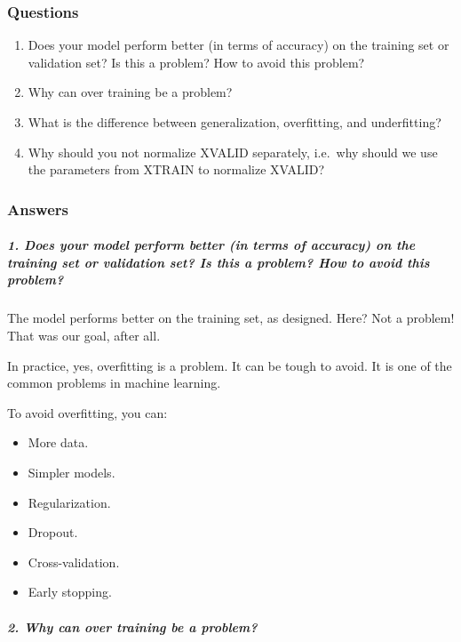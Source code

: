 \documentclass[11pt]{article}
\providecommand{\tightlist}{%
      \setlength{\itemsep}{0pt}\setlength{\parskip}{0pt}}
\begin{document}
\subsubsection{Questions}\label{questions}

\begin{enumerate}
\def\labelenumi{\arabic{enumi}.}
\tightlist
\item
  Does your model perform better (in terms of accuracy) on the training
  set or validation set? Is this a problem? How to avoid this problem?
\item
  Why can over training be a problem?
\item
  What is the difference between generalization, overfitting, and
  underfitting?
\item
  Why should you not normalize XVALID separately, i.e.~why should we use
  the parameters from XTRAIN to normalize XVALID?
\end{enumerate}

\subsubsection{Answers}\label{answers}

\subparagraph{1. Does your model perform better (in terms of accuracy)
on the training set or validation set? Is this a problem? How to avoid
this
problem?}\label{does-your-model-perform-better-in-terms-of-accuracy-on-the-training-set-or-validation-set-is-this-a-problem-how-to-avoid-this-problem}

The model performs better on the training set, as designed. Here? Not a
problem! That was our goal, after all.

In practice, yes, overfitting is a problem. It can be tough to avoid. It
is one of the common problems in machine learning.

To avoid overfitting, you can:

\begin{itemize}
\tightlist
\item
  More data.
\item
  Simpler models.
\item
  Regularization.
\item
  Dropout.
\item
  Cross-validation.
\item
  Early stopping.
\end{itemize}

\subparagraph{2. Why can over training be a
problem?}\label{why-can-over-training-be-a-problem}
\end{document}
